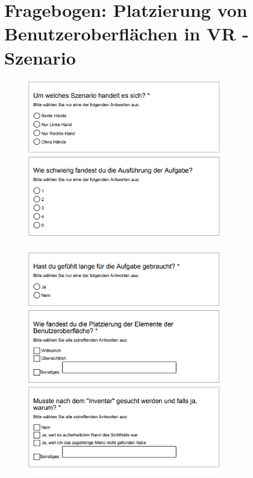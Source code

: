 \chapter{Fragebogen: Platzierung von Benutzeroberflächen in VR - Szenario}\label{chapter:fragen2}
	\begin{figure}[htbp]
		\centering
		\includegraphics[width=0.75\textwidth]{Fragen/1Szenario.png}
	\end{figure}

	\begin{figure}[htbp]
		\centering
		\includegraphics[width=0.75\textwidth]{Fragen/2Szenario.png}
	\end{figure}

